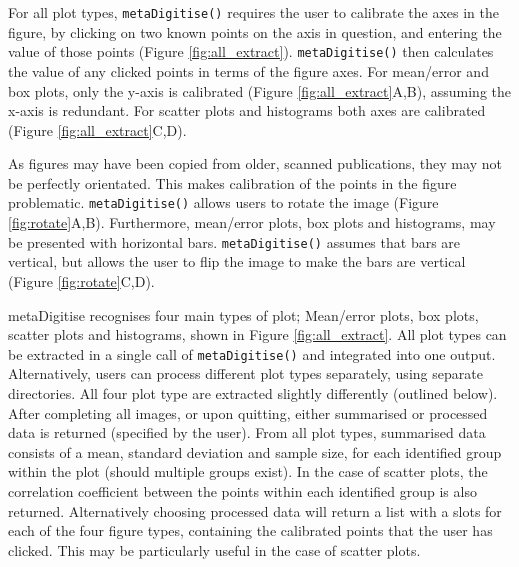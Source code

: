 \documentclass[12pt]{article}
\newcommand{\fct}[1]{\texttt{#1()}}
\newcommand{\pkg}[1]{{\fontseries{b}\selectfont #1}}
\begin{document}
For all plot types, \fct{metaDigitise} requires the user to calibrate the axes in the figure, by clicking on two known points on the axis in question, and entering the value of those points (Figure \ref{fig:all_extract}). \fct{metaDigitise} then calculates the value of any clicked points in terms of the figure axes. For mean/error and box plots, only the y-axis is calibrated (Figure \ref{fig:all_extract}A,B), assuming the x-axis is redundant. For scatter plots and histograms both axes are calibrated (Figure \ref{fig:all_extract}C,D).

As figures may have been copied from older, scanned publications, they may not be perfectly orientated. This makes calibration of the points in the figure problematic. \fct{metaDigitise} allows users to rotate the image (Figure \ref{fig:rotate}A,B). Furthermore, mean/error plots, box plots and histograms, may be presented with horizontal bars. \fct{metaDigitise} assumes that bars are vertical, but allows the user to flip the image to make the bars are vertical (Figure \ref{fig:rotate}C,D).

\pkg{metaDigitise} recognises four main types of plot; Mean/error plots, box plots, scatter plots and histograms, shown in Figure \ref{fig:all_extract}. All plot types can be extracted in a single call of \fct{metaDigitise} and integrated into one output. Alternatively, users can process different plot types separately, using separate directories. All four plot type are extracted slightly differently (outlined below). After completing all images, or upon quitting, either summarised or processed data is returned (specified by the user). From all plot types, summarised data consists of a mean, standard deviation and sample size, for each identified group within the plot (should multiple groups exist). In the case of scatter plots, the correlation coefficient between the points within each identified group is also returned. Alternatively choosing processed data will return a list with a slots for each of the four figure types, containing the calibrated points that the user has clicked. This may be particularly useful in the case of scatter plots. 
\end{document}
